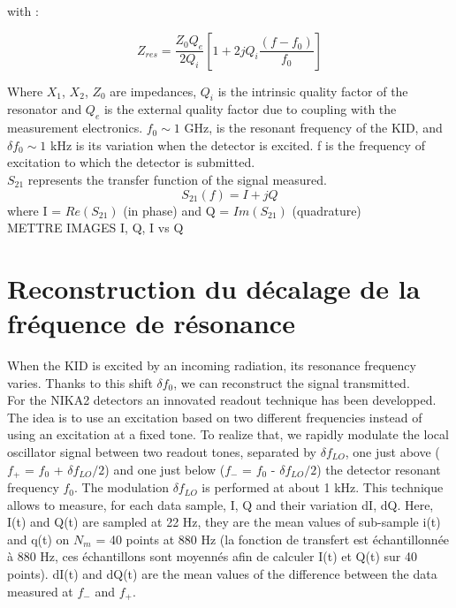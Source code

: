 \documentclass[english,11pt]{report}
\begin{document}
with :

\begin{equation}
Z_{res} = \frac{Z_{0}Q_{e}}{2Q_{i}}[1 + 2jQ_{i}\frac{(f-f_{0})}{f_{0}}]
\end{equation}

Where $X_{1}$, $X_{2}$, $Z_{0}$ are impedances, $Q_{i}$ is the intrinsic quality factor of the resonator and $Q_{e}$ is the external quality factor due to coupling with the measurement electronics. $f_{0} \sim 1$ GHz, is the resonant frequency of the KID, and $\delta f_{0} \sim 1$ kHz is its variation when the detector is excited. f is the frequency of excitation to which the detector is submitted.\\

$S_{21}$ represents the transfer function of the signal measured.
\begin{equation}
S_{21}(f) = I + jQ
\end{equation}
where I = $Re(S_{21})$ (in phase) and Q = $Im(S_{21})$ (quadrature)\\

METTRE IMAGES I, Q, I vs Q
	\section{Reconstruction du décalage de la fréquence de résonance}
	
When the KID is excited by an incoming radiation, its resonance frequency varies. Thanks to this shift $\delta f_{0}$, we can reconstruct the signal transmitted.\\
For the NIKA2 detectors an innovated readout technique has been developped. The idea is to use an excitation based on two different frequencies instead of using an excitation at a fixed tone. To realize that, we rapidly modulate the local oscillator signal between two readout tones, separated by $\delta f_{LO}$, one just above ($f_{+}$ = $f_{0}$ + $\delta f_{LO}/2$) and one just below ($f_{-}$ = $f_{0}$ - $\delta f_{LO}/2$) the detector resonant frequency $f_{0}$. The modulation $\delta f_{LO}$ is performed at about 1 kHz. This technique allows to measure, for each data sample, I, Q and their variation dI, dQ. Here, I(t) and Q(t) are sampled at 22 Hz, they are the mean values of sub-sample i(t) and q(t) on $N_{m}$ = 40 points at 880 Hz (la fonction de transfert est échantillonnée à 880 Hz, ces échantillons sont moyennés afin de calculer I(t) et Q(t) sur 40 points). dI(t) and dQ(t) are the mean values of the difference between the data measured at $f_{-}$ and $f_{+}$. 
\end{document}

